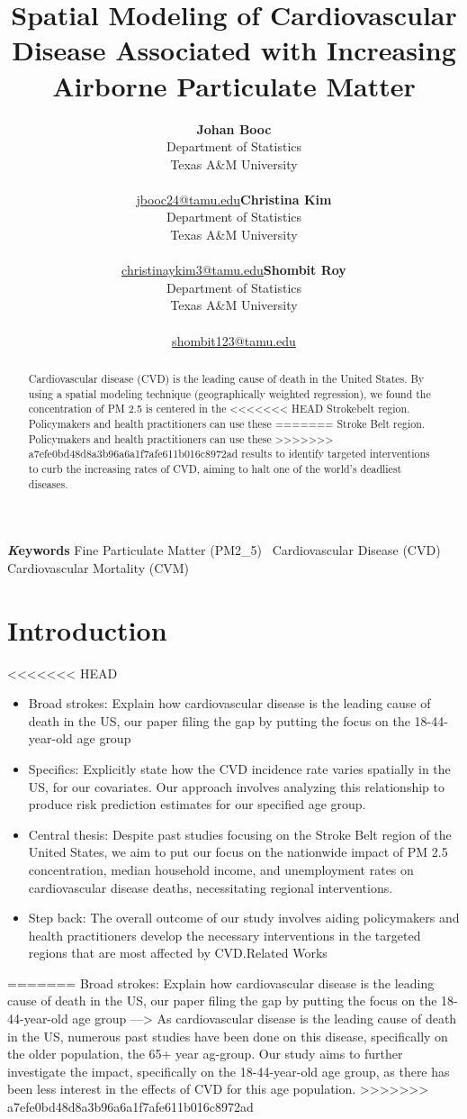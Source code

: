 \documentclass[
]{article}
\title{Spatial Modeling of Cardiovascular Disease Associated with
Increasing Airborne Particulate Matter}
\author{\textbf{Johan Booc}\\Department of Statistics\\Texas A\&M
University\\\\\href{mailto:jbooc24@tamu.edu}{jbooc24@tamu.edu}\asep\textbf{Christina
Kim}\\Department of Statistics\\Texas A\&M
University\\\\\href{mailto:christinaykim3@tamu.edu}{christinaykim3@tamu.edu}\asep\textbf{Shombit
Roy}\\Department of Statistics\\Texas A\&M
University\\\\\href{mailto:shombit123@tamu.edu}{shombit123@tamu.edu}}
\date{}
\begin{document}
\maketitle
\begin{abstract}
Cardiovascular disease (CVD) is the leading cause of death in the United
States. By using a spatial modeling technique (geographically weighted
regression), we found the concentration of PM 2.5 is centered in the
<<<<<<< HEAD
Strokebelt region. Policymakers and health practitioners can use these
=======
Stroke Belt region. Policymakers and health practitioners can use these
>>>>>>> a7efe0bd48d8a3b96a6a1f7afe611b016c8972ad
results to identify targeted interventions to curb the increasing rates
of CVD, aiming to halt one of the world's deadliest diseases.
\end{abstract}
{\bfseries \emph Keywords}
\def\sep{\textbullet\ }
Fine Particulate Matter (PM2\_5) \sep Cardiovascular Disease (CVD) \sep 
Cardiovascular Mortality (CVM)


\section{Introduction}\label{sec-intro}

<<<<<<< HEAD
\begin{itemize}
\item
  Broad strokes: Explain how cardiovascular disease is the leading cause
  of death in the US, our paper filing the gap by putting the focus on
  the 18-44-year-old age group~
\item
  Specifics: Explicitly state how the CVD incidence rate varies
  spatially in the US, for our covariates. Our approach involves
  analyzing this relationship to produce risk prediction estimates for
  our specified age group.~
\item
  Central thesis: Despite past studies focusing on the Stroke Belt
  region of the United States, we aim to put our focus on the nationwide
  impact of PM 2.5 concentration, median household income, and
  unemployment rates on cardiovascular disease deaths, necessitating
  regional interventions.
\item
  Step back: The overall outcome of our study involves aiding
  policymakers and health practitioners develop the necessary
  interventions in the targeted regions that are most affected by
  CVD.Related Works
\end{itemize}
=======
Broad strokes: Explain how cardiovascular disease is the leading cause
of death in the US, our paper filing the gap by putting the focus on the
18-44-year-old age group ---\textgreater{} As cardiovascular disease is
the leading cause of death in the US, numerous past studies have been
done on this disease, specifically on the older population, the 65+ year
ag-group. Our study aims to further investigate the impact, specifically
on the 18-44-year-old age group, as there has been less interest in the
effects of CVD for this age population.
>>>>>>> a7efe0bd48d8a3b96a6a1f7afe611b016c8972ad
\end{document}
